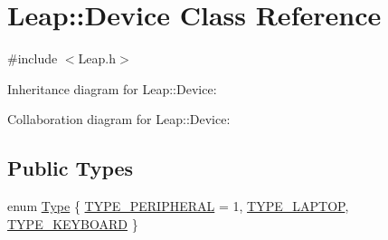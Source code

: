 \hypertarget{class_leap_1_1_device}{}\section{Leap\+:\+:Device Class Reference}
\label{class_leap_1_1_device}


{\ttfamily \#include $<$Leap.\+h$>$}



Inheritance diagram for Leap\+:\+:Device\+:


Collaboration diagram for Leap\+:\+:Device\+:
\subsection*{Public Types}
\begin{DoxyCompactItemize}
\item 
enum \hyperlink{class_leap_1_1_device_a1b7477f6d382b15a77a00712a70628b2}{Type} \{ \hyperlink{class_leap_1_1_device_a1b7477f6d382b15a77a00712a70628b2ab6881a7011d2914e86b452fd3e0f903f}{T\+Y\+P\+E\+\_\+\+P\+E\+R\+I\+P\+H\+E\+R\+AL} = 1, 
\hyperlink{class_leap_1_1_device_a1b7477f6d382b15a77a00712a70628b2a6e685da1e914524572163c510c5acc58}{T\+Y\+P\+E\+\_\+\+L\+A\+P\+T\+OP}, 
\hyperlink{class_leap_1_1_device_a1b7477f6d382b15a77a00712a70628b2ac0aaf88576a6b2408c130c7344c8adad}{T\+Y\+P\+E\+\_\+\+K\+E\+Y\+B\+O\+A\+RD}
 \}
\end{DoxyCompactItemize}
